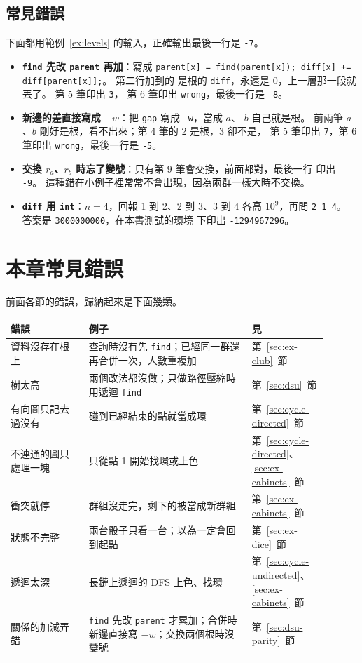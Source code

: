 \subsection{常見錯誤}

下面都用範例~\ref{ex:levels} 的輸入，正確輸出最後一行是 \texttt{-7}。

\begin{itemize}
\item \textbf{\texttt{find} 先改 \texttt{parent} 再加}：寫成
\texttt{parent[x] = find(parent[x]); diff[x] += diff[parent[x]];}。 第二行加到的
是根的 \texttt{diff}，永遠是 $0$，上一層那一段就丟了。 第 5 筆印出 \texttt{3}，
第 6 筆印出 \texttt{wrong}，最後一行是 \texttt{-8}。
\item \textbf{新邊的差直接寫成 $-w$}：把 \texttt{gap} 寫成 \texttt{-w}，當成 $a$、
$b$ 自己就是根。 前兩筆 $a$、$b$ 剛好是根，看不出來；第 4 筆的 2 是根，3 卻不是，
第 5 筆印出 \texttt{7}，第 6 筆印出 \texttt{wrong}，最後一行是 \texttt{-5}。
\item \textbf{交換 $r_a$、$r_b$ 時忘了變號}：只有第 9 筆會交換，前面都對，最後一行
印出 \texttt{-9}。 這種錯在小例子裡常常不會出現，因為兩群一樣大時不交換。
\item \textbf{\texttt{diff} 用 \texttt{int}}：$n = 4$，回報 1 到 2、2 到 3、3 到 4
各高 $10^9$，再問 \texttt{2 1 4}。 答案是 \texttt{3000000000}，在本書測試的環境
下印出 \texttt{-1294967296}。
\end{itemize}

\section{本章常見錯誤}
\label{sec:dsu-pitfalls}

前面各節的錯誤，歸納起來是下面幾類。

\begin{center}
\begin{tabular}{p{0.24\linewidth}p{0.5\linewidth}p{0.16\linewidth}}
\toprule
錯誤 & 例子 & 見 \\
\midrule
資料沒存在根上 & 查詢時沒有先 \texttt{find}；已經同一群還再合併一次，人數重複加 &
第~\ref{sec:ex-club}~節 \\
樹太高 & 兩個改法都沒做；只做路徑壓縮時用遞迴 \texttt{find} &
第~\ref{sec:dsu}~節 \\
有向圖只記去過沒有 & 碰到已經結束的點就當成環 & 第~\ref{sec:cycle-directed}~節 \\
不連通的圖只處理一塊 & 只從點 1 開始找環或上色 & 第~\ref{sec:cycle-directed}、
\ref{sec:ex-cabinets}~節 \\
衝突就停 & 群組沒走完，剩下的被當成新群組 & 第~\ref{sec:ex-cabinets}~節 \\
狀態不完整 & 兩台骰子只看一台；以為一定會回到起點 & 第~\ref{sec:ex-dice}~節 \\
遞迴太深 & 長鏈上遞迴的 DFS 上色、找環 & 第~\ref{sec:cycle-undirected}、
\ref{sec:ex-cabinets}~節 \\
關係的加減弄錯 & \texttt{find} 先改 \texttt{parent} 才累加；合併時新邊直接寫
$-w$；交換兩個根時沒變號 & 第~\ref{sec:dsu-parity}~節 \\
\bottomrule
\end{tabular}
\end{center}

